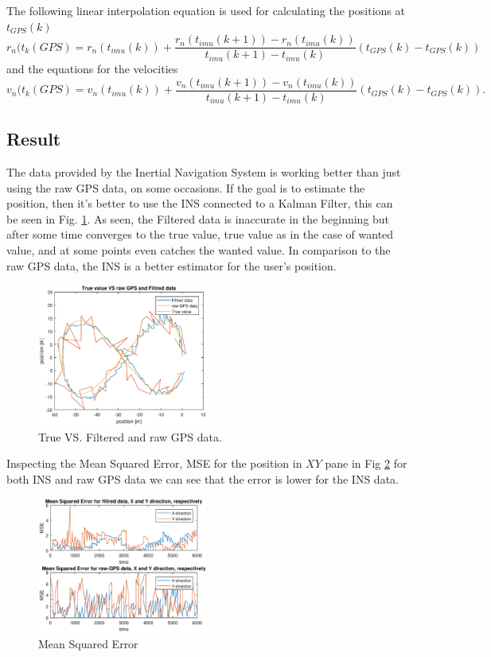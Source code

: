 The following linear interpolation equation is used for calculating the positions at $t_{GPS}(k)$
\begin{equation}
r_n(t_k(GPS) = r_n(t_{imu}(k)) + \frac{r_n(t_{imu}(k+1))-r_n(t_{imu}(k))}{t_{imu}(k+1)-t_{imu}(k)}(t_{GPS}(k)-t_{GPS}(k))
\end{equation}
 and the equations for the velocities 
 \begin{equation}
v_n(t_k(GPS) = v_n(t_{imu}(k)) + \frac{v_n(t_{imu}(k+1))-v_n(t_{imu}(k))}{t_{imu}(k+1)-t_{imu}(k)}(t_{GPS}(k)-t_{GPS}(k)).
\end{equation}
\subsection{Result}
The data provided by the Inertial Navigation System is working better than just using the raw GPS data, on some occasions. If the goal is to estimate the position, then it's better to use the INS connected to a Kalman Filter, this can be seen in Fig. \ref{Fig:result_kalman}. As seen, the Filtered data is inaccurate in the beginning but after some time converges to the true value, true value as in the case of wanted value, and at some points even catches the wanted value. In comparison to the raw GPS data, the INS is a better estimator for the user's position.
\begin{figure}[H]
\centering
\includegraphics[width=0.5\textwidth]{result.eps}
\caption{True VS. Filtered and raw GPS data.}
\label{Fig:result_kalman}
\end{figure}

Inspecting the Mean Squared Error, MSE for the position in $XY$ pane in Fig \ref{Fig:mse} for both INS and raw GPS data we can see that the error is lower for the INS data. 
\begin{figure}[H]
\centering
\includegraphics[width=0.5\textwidth]{mse.eps}
\caption{Mean Squared Error}
\label{Fig:mse}
\end{figure}

